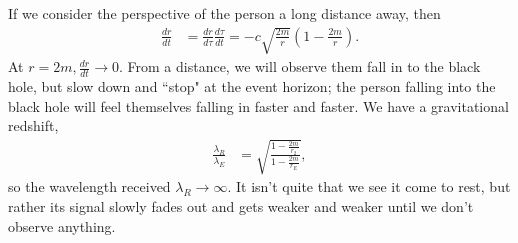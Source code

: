 \documentclass[a4paper, 11pt, normalem]{report}
\begin{document}
If we consider the perspective of the person a long distance away, then 
\begin{align}
    \frac{dr}{dt} &= \frac{dr}{d\tau}\frac{d\tau}{dt} = -c\sqrt{\frac{2m}{r}}\left(1-\frac{2m}{r}\right).
\end{align}
At $r=2m,\frac{dr}{dt}\to0$.
From a distance, we will observe them fall in to the black hole, but slow down and ``stop" at the event horizon; the person falling into the black hole will feel themselves falling in faster and faster. 
We have a gravitational redshift, 
\begin{align}
    \frac{\lambda_R}{\lambda_E} &= \sqrt{\frac{1-\frac{2m}{r_2}}{1-\frac{2m}{r_E}}},
\end{align}
so the wavelength received $\lambda_R\to\infty$.
It isn't quite that we see it come to rest, but rather its signal slowly fades out and gets weaker and weaker until we don't observe anything.
\end{document}
